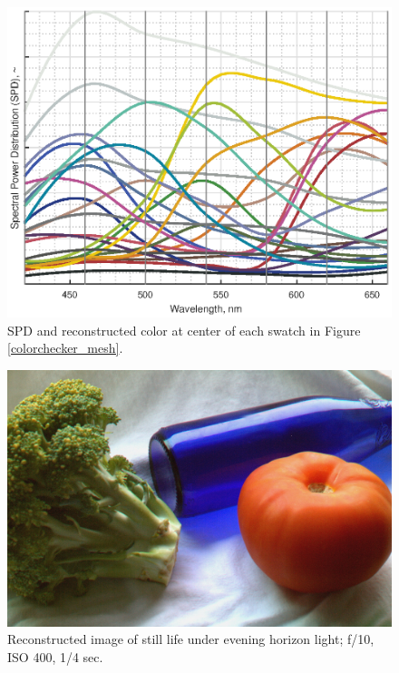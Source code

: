 \documentclass[twocolumn,10pt]{asme2ej}
\begin{document}
\begin{figure}[H]
\begin{centering}
  \includegraphics[height=0.6\linewidth]{colorchecker_SPDs.eps}
  \caption{SPD and reconstructed color at center of each swatch in Figure \ref{colorchecker_mesh}.}
  \label{colorchecker_SPDs}
    \end{centering}
\end{figure}

\clearpage

\begin{figure}[H]
\begin{centering}
  \includegraphics[height=0.55\linewidth]{broccoli_bottle_tomato.jpg}
  \caption{Reconstructed image of still life under evening horizon light; f/10, ISO 400, 1/4 sec.}
  \label{tomato_mesh}
  \end{centering}
\end{figure}
\end{document}
